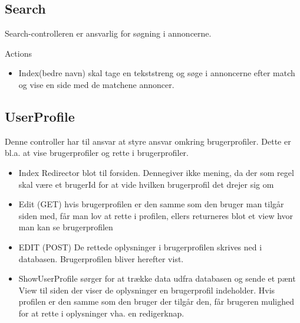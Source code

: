 \subsection{Search}
Search-controlleren er ansvarlig for søgning i annoncerne. 

Actions 
\begin{itemize}
	\item Index(bedre navn) skal tage en tekststreng og søge i annoncerne efter match og vise en side med de matchene annoncer.
\end{itemize}

\subsection{UserProfile}
Denne controller har til ansvar at styre ansvar omkring brugerprofiler. Dette er bl.a. at vise brugerprofiler og rette i brugerprofiler.

\begin{itemize}
	\item Index Redirector blot til forsiden. Dennegiver ikke mening, da der som regel skal være et brugerId for at vide hvilken brugerprofil det drejer sig om
	\item Edit (GET) hvis brugerprofilen er den samme som den bruger man tilgår siden med, får man lov at rette i profilen, ellers returneres blot et view hvor man kan se brugerprofilen
	\item EDIT (POST) De rettede oplysninger i brugerprofilen skrives ned i databasen. Brugerprofilen bliver herefter vist.
	\item ShowUserProfile sørger for at trække data udfra databasen og sende et pænt View til siden der viser de oplysninger en brugerprofil indeholder. Hvis profilen er den samme som den bruger der tilgår den, får brugeren mulighed for at rette i oplysninger vha. en redigerknap.
\end{itemize}
